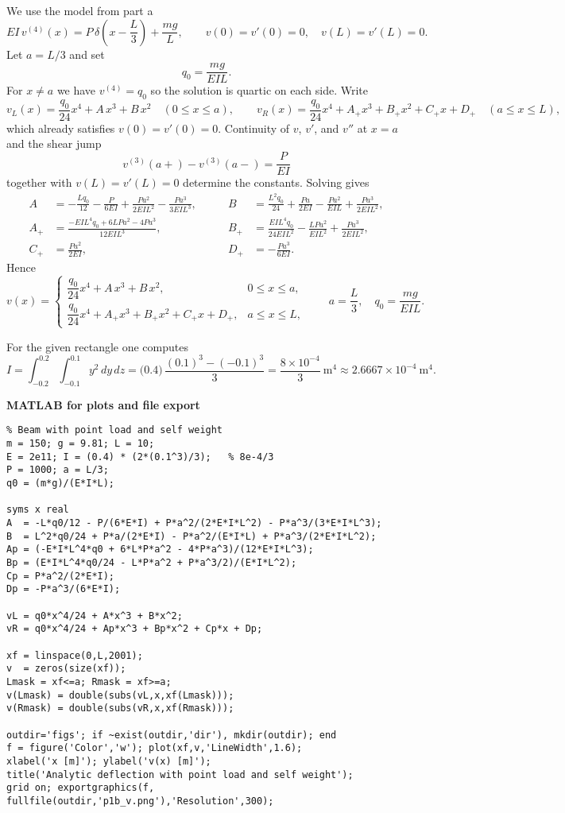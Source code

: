 \documentclass[12pt, a4paper]{article}
\begin{document}
We use the model from part a
\[
E I\,v^{(4)}(x)=P\,\delta\!\left(x-\frac{L}{3}\right)+\frac{m g}{L},
\qquad
v(0)=v'(0)=0,\quad v(L)=v'(L)=0.
\]
Let $a=L/3$ and set
\[
q_{0}=\frac{m g}{E I L}.
\]
For $x\neq a$ we have $v^{(4)}=q_{0}$ so the solution is quartic on each side.
Write
\[
v_{L}(x)=\frac{q_{0}}{24}x^{4}+A\,x^{3}+B\,x^{2}\quad(0\le x\le a),\qquad
v_{R}(x)=\frac{q_{0}}{24}x^{4}+A_{+}x^{3}+B_{+}x^{2}+C_{+}x+D_{+}\quad(a\le x\le L),
\]
which already satisfies $v(0)=v'(0)=0$.
Continuity of $v$, $v'$, and $v''$ at $x=a$ and the shear jump
\[
v^{(3)}(a+)-v^{(3)}(a-)=\frac{P}{E I}
\]
together with $v(L)=v'(L)=0$ determine the constants. Solving gives
\[
\begin{aligned}
A&=-\frac{L q_{0}}{12}-\frac{P}{6 E I}+\frac{P a^{2}}{2 E I L^{2}}-\frac{P a^{3}}{3 E I L^{3}},
&\qquad
B&=\frac{L^{2}q_{0}}{24}+\frac{P a}{2E I}-\frac{P a^{2}}{E I L}+\frac{P a^{3}}{2E I L^{2}},\\[2mm]
A_{+}&=\frac{-E I L^{4} q_{0}+6 L P a^{2}-4 P a^{3}}{12 E I L^{3}},
&\qquad
B_{+}&=\frac{E I L^{4} q_{0}}{24 E I L^{2}}-\frac{L P a^{2}}{E I L^{2}}+\frac{P a^{3}}{2 E I L^{2}},\\[2mm]
C_{+}&=\frac{P a^{2}}{2E I},
&\qquad
D_{+}&=-\frac{P a^{3}}{6E I}.
\end{aligned}
\]
Hence
\[
\boxed{
v(x)=
\begin{cases}
\dfrac{q_{0}}{24}x^{4}+A\,x^{3}+B\,x^{2}, & 0\le x\le a,\\[6pt]
\dfrac{q_{0}}{24}x^{4}+A_{+}x^{3}+B_{+}x^{2}+C_{+}x+D_{+}, & a\le x\le L,
\end{cases}}
\qquad a=\dfrac{L}{3},\quad q_{0}=\dfrac{m g}{E I L}.
\]

For the given rectangle one computes
\[
I=\int_{-0.2}^{0.2}\!\int_{-0.1}^{0.1} y^{2}\,dy\,dz
= \bigl(0.4\bigr)\,\frac{(0.1)^{3}-(-0.1)^{3}}{3}
= \frac{8\times 10^{-4}}{3}\ \mathrm{m^{4}} \approx 2.6667\times 10^{-4}\ \mathrm{m^{4}}.
\]

\textbf{MATLAB for plots and file export}
\begin{verbatim}
% Beam with point load and self weight
m = 150; g = 9.81; L = 10;
E = 2e11; I = (0.4) * (2*(0.1^3)/3);   % 8e-4/3
P = 1000; a = L/3;
q0 = (m*g)/(E*I*L);

syms x real
A  = -L*q0/12 - P/(6*E*I) + P*a^2/(2*E*I*L^2) - P*a^3/(3*E*I*L^3);
B  = L^2*q0/24 + P*a/(2*E*I) - P*a^2/(E*I*L) + P*a^3/(2*E*I*L^2);
Ap = (-E*I*L^4*q0 + 6*L*P*a^2 - 4*P*a^3)/(12*E*I*L^3);
Bp = (E*I*L^4*q0/24 - L*P*a^2 + P*a^3/2)/(E*I*L^2);
Cp = P*a^2/(2*E*I);
Dp = -P*a^3/(6*E*I);

vL = q0*x^4/24 + A*x^3 + B*x^2;
vR = q0*x^4/24 + Ap*x^3 + Bp*x^2 + Cp*x + Dp;

xf = linspace(0,L,2001);
v  = zeros(size(xf));
Lmask = xf<=a; Rmask = xf>=a;
v(Lmask) = double(subs(vL,x,xf(Lmask)));
v(Rmask) = double(subs(vR,x,xf(Rmask)));

outdir='figs'; if ~exist(outdir,'dir'), mkdir(outdir); end
f = figure('Color','w'); plot(xf,v,'LineWidth',1.6);
xlabel('x [m]'); ylabel('v(x) [m]');
title('Analytic deflection with point load and self weight');
grid on; exportgraphics(f, fullfile(outdir,'p1b_v.png'),'Resolution',300);
\end{verbatim}
\end{document}
